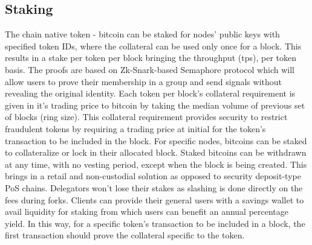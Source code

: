 \documentclass[a4paper,	10pt]{extarticle}
\begin{document}
\subsection{Staking}
The chain native token - bitcoin can be staked for nodes' public keys with specified token IDs, where the collateral can be used only once for a block. This results in a stake per token per block bringing the throughput (tps), per token basis. The proofs are based on Zk-Snark-based Semaphore protocol \cite{semaphore} which will allow users to prove their membership in a group and send signals without revealing the original identity. Each token per block's collateral requirement is given in it's trading price to bitcoin by taking the median volume of previous set of blocks (ring size). This collateral requirement provides security to restrict fraudulent tokens by requiring a trading price at initial for the token's transaction to be included in the block. For specific nodes, bitcoins can be staked to collateralize or lock in their allocated block. Staked bitcoins can be withdrawn at any time, with no vesting period, except when the block is being created. This brings in a retail and non-custodial solution as opposed to security deposit-type PoS chains. Delegators won't lose their stakes as slashing is done directly on the fees during forks. Clients can provide their general users with a savings wallet to avail liquidity for staking from which users can benefit an annual percentage yield. In this way, for a specific token's transaction to be included in a block, the first transaction should prove the collateral specific to the token.
\end{document}
